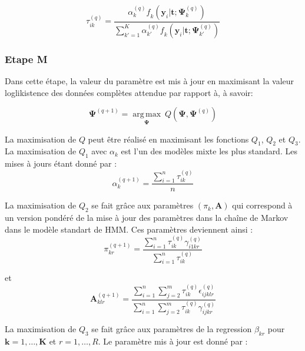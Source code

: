 \documentclass[11pt]{article}
\DeclareMathOperator*{\argmax}{arg\,max}
\newcommand{\bsy}{\boldsymbol{y}}
\newcommand{\bsk}{\boldsymbol{k}}
\newcommand{\bst}{\boldsymbol{t}}
\newcommand{\cif}{\textit{f}}
\newcommand{\ciQ}{\textit{Q}}
\newcommand{\ciR}{\textit{R}}
\newcommand{\cir}{\textit{r}}
\newcommand{\sumn}{\sum_{i=1}^{n}}
\newcommand{\bK}{\mathbf{K}}
\newcommand{\bA}{\mathbf{A}}
\newcommand{\bsPsi}{\boldsymbol{\Psi}}
\begin{document}
\begin{equation}
\tau_{ik}^{(q)}= \frac{\alpha_{k}^{(q)} \cif_{k}(\bsy_{i} | \bst ; \bsPsi_{k}^{(q)})}{\sum_{k'=1}^{K} \alpha_{k'}^{(q)} \cif_{k}(\bsy_{i} | \bst ; \bsPsi_{k'}^{(q)}) }
\end{equation}


\subsubsection{Etape M}

Dans cette étape, la valeur du paramètre est mis à jour en maximisant la valeur loglikistence des données complètes attendue par rapport à, à savoir: 

\begin{equation}
\bsPsi^{(q+1)}  = \underset{\bsPsi}{\argmax}  \ \ciQ ( \bsPsi, \bsPsi^{(q)} ) 
\end{equation}

La maximisation de $\ciQ$ peut être réalisé en maximisant les fonctions $\ciQ_{1}$,  $\ciQ_{2}$ et  $\ciQ_{3}$. La maximisation de  $\ciQ_{1}$ avec $\alpha_{k}$ est l'un des modèles mixte les plus standard. Les mises à jours étant donné par : \\

\begin{equation}
\alpha_{k}^{(q+1)} = \frac{\sumn \tau_{ik}^{(q)}}{n}
\end{equation}

La maximisation de $\ciQ_{2}$ se fait grâce aux paramètres $(\pi_{k}, \bA)$ qui correspond à un version pondéré de la mise à jour des paramètres dans la chaîne de Markov dans le modèle standart de HMM. Ces paramètres deviennent ainsi :\\


\begin{equation}
\pi_{kr}^{(q+1)} = \frac { \sumn \tau_{ik}^{(q)} \gamma_{i1kr}^{(q)}}{ \sumn \tau_{ik}^{(q)}}
\end{equation}

et \\

\begin{equation}
\bA_{klr}^{(q+1)}= \frac { \sumn \sum_{j=2}^{m} \tau_{ik}^{(q)} \epsilon_{ijklr}^{(q)}}{\sumn \sum_{j=2}^{m} \tau_{ik}^{(q)} \gamma_{ijkr}^{(q)}}
\end{equation}

La maximisation de $\ciQ_{3}$ se fait grâce aux paramètres de la regression $\beta_{kr}$ pour $\bsk = 1,\ldots,\bK$ et $\cir = 1,\ldots,\ciR$. Le paramètre mis à jour est donné par : \\
\end{document}
